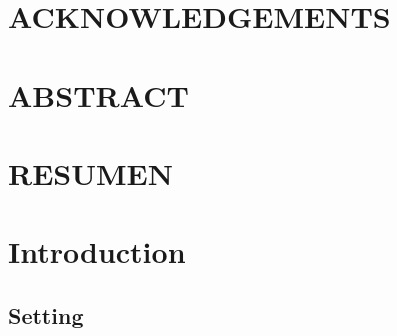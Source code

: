 \documentclass[pdftex]{pucthesis}	%
\begin{document}
 \label{acknowledgements} %
\chapter*{ACKNOWLEDGEMENTS}           


\cleardoublepage



\tableofcontents
{} \label{listoffigures}
\listoffigures
{} \label{listoftables}
\listoftables
\cleardoublepage



 \label{abstract}
\chapter*{ABSTRACT}

\cleardoublepage

 \label{resumen}
\chapter*{RESUMEN}

\cleardoublepage




\chapter[INTRODUCTION]{Introduction}

\section{Setting}


\end{document}
